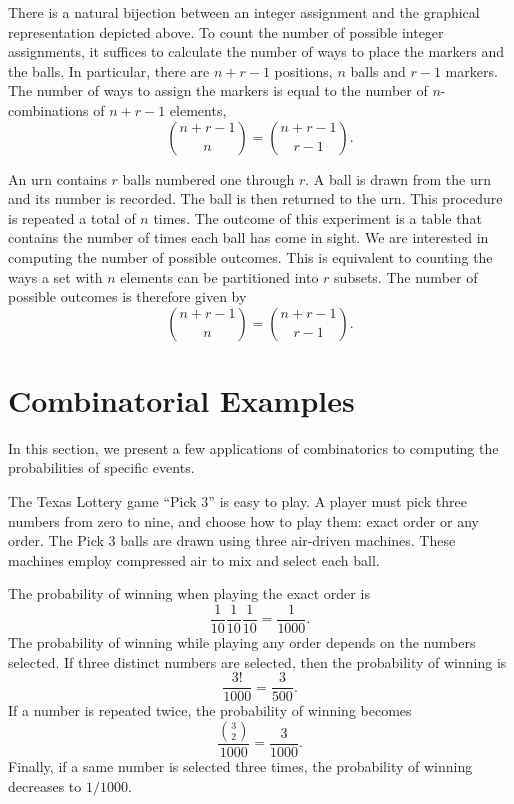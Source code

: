 There is a natural bijection between an integer assignment and the graphical representation depicted above.
To count the number of possible integer assignments, it suffices to calculate the number of ways to place the markers and the balls.
In particular, there are $n + r - 1$ positions, $n$ balls and $r - 1$ markers.
The number of ways to assign the markers is equal to the number of $n$-combinations of $n + r - 1$ elements,
\begin{equation*}
\binom{n + r - 1}{n} = \binom{n + r - 1}{r - 1} .
\end{equation*}

\begin{example}
An urn contains $r$ balls numbered one through $r$.
A ball is drawn from the urn and its number is recorded.
The ball is then returned to the urn.
This procedure is repeated a total of $n$ times.
The outcome of this experiment is a table that contains the number of times each ball has come in sight.
We are interested in computing the number of possible outcomes.
This is equivalent to counting the ways a set with $n$ elements can be partitioned into $r$ subsets.
The number of possible outcomes is therefore given by
\begin{equation*}
\binom{n + r - 1}{n} = \binom{n + r - 1}{r - 1} .
\end{equation*}
\end{example}


\section{Combinatorial Examples}

In this section, we present a few applications of combinatorics to computing the probabilities of specific events.

\begin{example}
The Texas Lottery game ``Pick $3$'' is easy to play.
A player must pick three numbers from zero to nine, and choose how to play them: exact order or any order.
The Pick $3$ balls are drawn using three air-driven machines.
These machines employ compressed air to mix and select each ball.

The probability of winning when playing the exact order is
\begin{equation*}
\frac{1}{10} \frac{1}{10} \frac{1}{10}
= \frac{1}{1000} .
\end{equation*}
The probability of winning while playing any order depends on the numbers selected.
If three distinct numbers are selected, then the probability of winning is
\begin{equation*}
\frac{3!}{1000} = \frac{3}{500} .
\end{equation*}
If a number is repeated twice, the probability of winning becomes
\begin{equation*}
\frac{\binom{3}{2}}{1000} = \frac{3}{1000} .
\end{equation*}
Finally, if a same number is selected three times, the probability of winning decreases to $1/1000$.
\end{example}


